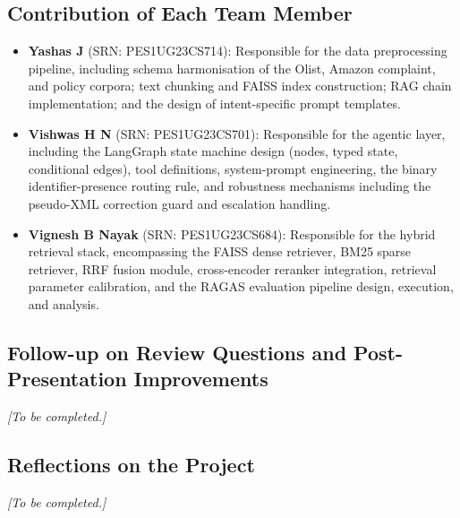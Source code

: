 \documentclass[conference]{IEEEtran}
\begin{document}
\subsection*{Contribution of Each Team Member}
\begin{itemize}
  \item \textbf{Yashas J} (SRN: PES1UG23CS714): Responsible for the data
        preprocessing pipeline, including schema harmonisation of the Olist,
        Amazon complaint, and policy corpora; text chunking and FAISS index
        construction; RAG chain implementation; and the design of intent-specific
        prompt templates.

  \item \textbf{Vishwas H N} (SRN: PES1UG23CS701): Responsible for the agentic
        layer, including the LangGraph state machine design (nodes, typed state,
        conditional edges), tool definitions, system-prompt engineering, the
        binary identifier-presence routing rule, and robustness mechanisms
        including the pseudo-XML correction guard and escalation handling.

  \item \textbf{Vignesh B Nayak} (SRN: PES1UG23CS684): Responsible for the hybrid
        retrieval stack, encompassing the FAISS dense retriever, BM25 sparse
        retriever, RRF fusion module, cross-encoder reranker integration, retrieval
        parameter calibration, and the RAGAS evaluation pipeline design, execution,
        and analysis.
\end{itemize}

\subsection*{Follow-up on Review Questions and Post-Presentation Improvements}
\textit{[To be completed.]}

\subsection*{Reflections on the Project}
\textit{[To be completed.]}
\end{document}
